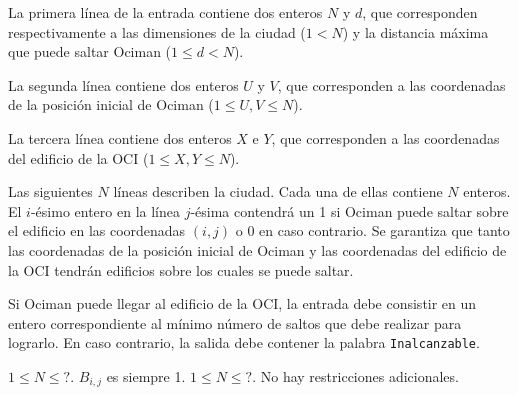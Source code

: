 \documentclass{oci}
\begin{document}
\begin{inputDescription}
La primera línea de la entrada contiene dos enteros $N$ y $d$, que corresponden
respectivamente a las dimensiones de la ciudad ($1 < N$) y la distancia máxima
que puede saltar Ociman ($1 \le d < N$).

La segunda línea contiene dos enteros $U$ y $V$, que corresponden a las
coordenadas de la posición inicial de Ociman ($1 \le U, V \le N$).

La tercera línea contiene dos enteros $X$ e $Y$, que corresponden a las
coordenadas del edificio de la OCI ($1 \le X, Y \le N$).

Las siguientes $N$ líneas describen la ciudad.
Cada una de ellas contiene $N$ enteros.
El $i$-ésimo entero en la línea $j$-ésima contendrá un 1 si Ociman puede saltar
sobre el edificio en las coordenadas $(i, j)$ o 0 en caso contrario.
Se garantiza que tanto las coordenadas de la posición inicial de Ociman y las
coordenadas del edificio de la OCI tendrán edificios sobre los cuales se
puede saltar.
\end{inputDescription}

\begin{outputDescription}
Si Ociman puede llegar al edificio de la OCI, la entrada debe consistir
en un entero correspondiente al mínimo número de saltos que debe realizar para
lograrlo.
En caso contrario, la salida debe contener la palabra \verb-Inalcanzable-.
\end{outputDescription}

\begin{scoreDescription}
   $1 \le N \le ?$. $B_{i,j}$ es siempre 1.
   $1 \le N \le ?$. No hay restricciones adicionales.
\end{scoreDescription}

\begin{sampleDescription}
\end{sampleDescription}
\end{document}
